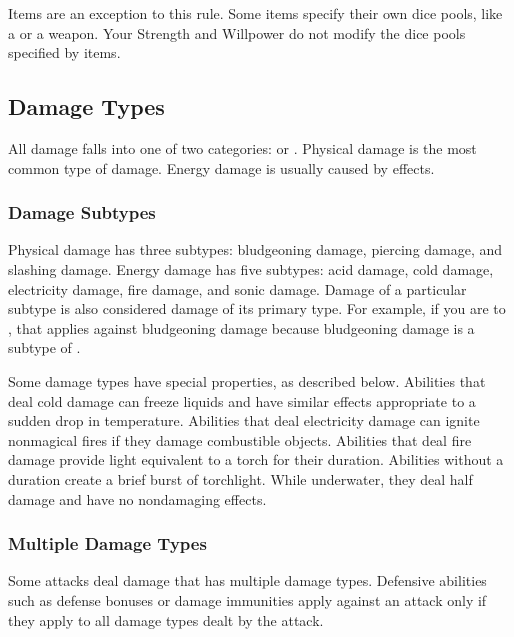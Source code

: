             Items are an exception to this rule.
            Some items specify their own dice pools, like a  or a  weapon.
            Your Strength and Willpower do not modify the dice pools specified by items.

    \subsection{Damage Types}\label{Damage Types}
        All damage falls into one of two categories:  or .
        Physical damage is the most common type of damage.
        Energy damage is usually caused by  effects.

        \subsubsection{Damage Subtypes}\label{Damage Subtypes}
            Physical damage has three subtypes: bludgeoning damage, piercing damage, and slashing damage.
            Energy damage has five subtypes: acid damage, cold damage, electricity damage, fire damage, and sonic damage.
            Damage of a particular subtype is also considered damage of its primary type.
            For example, if you are  to , that applies against bludgeoning damage because bludgeoning damage is a subtype of .

            Some damage types have special properties, as described below.
             Abilities that deal cold damage can freeze liquids and have similar effects appropriate to a sudden drop in temperature.
             Abilities that deal electricity damage can ignite nonmagical fires if they damage combustible objects.
             Abilities that deal fire damage provide light equivalent to a torch for their duration.
            Abilities without a duration create a brief burst of torchlight.
            While underwater, they deal half damage and have no nondamaging effects.

        \subsubsection{Multiple Damage Types}\label{Multiple Damage Types}
            Some attacks deal damage that has multiple damage types.
            Defensive abilities such as defense bonuses or damage immunities apply against an attack only if they apply to all damage types dealt by the attack.

